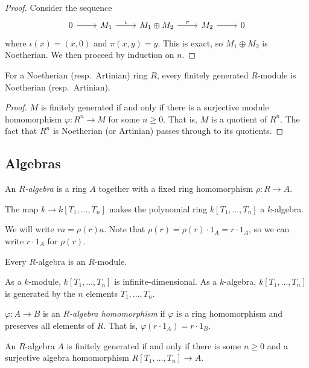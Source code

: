 \begin{proof}
    Consider the sequence
    \[\begin{tikzcd}
        0 & {M_1} & {M_1 \oplus M_2} & {M_2} & 0
        \arrow[from=1-1, to=1-2]
        \arrow["\iota", from=1-2, to=1-3]
        \arrow["\pi", from=1-3, to=1-4]
        \arrow[from=1-4, to=1-5]
    \end{tikzcd}\]
    where \( \iota(x) = (x, 0) \) and \( \pi(x, y) = y \).
    This is exact, so \( M_1 \oplus M_2 \) is Noetherian.
    We then proceed by induction on \( n \).
\end{proof}
\begin{proposition}
    For a Noetherian (resp.\ Artinian) ring \( R \), every finitely generated \( R \)-module is Noetherian (resp.\ Artinian).
\end{proposition}
\begin{proof}
    \( M \) is finitely generated if and only if there is a surjective module homomorphism \( \varphi : R^n \to M \) for some \( n \geq 0 \).
    That is, \( M \) is a quotient of \( R^n \).
    The fact that \( R^n \) is Noetherian (or Artinian) passes through to its quotients.
\end{proof}

\subsection{Algebras}
\begin{definition}
    An \emph{\( R \)-algebra} is a ring \( A \) together with a fixed ring homomorphism \( \rho : R \to A \).
\end{definition}
\begin{example}
    The map \( k \to k[T_1, \dots, T_n] \) makes the polynomial ring \( k[T_1, \dots, T_n] \) a \( k \)-algebra.
\end{example}
We will write \( ra = \rho(r) a \).
Note that \( \rho(r) = \rho(r) \cdot 1_A = r \cdot 1_A \), so we can write \( r \cdot 1_A \) for \( \rho(r) \).
\begin{remark}
    Every \( R \)-algebra is an \( R \)-module.
\end{remark}
\begin{example}
    As a \( k \)-module, \( k[T_1, \dots, T_n] \) is infinite-dimensional.
    As a \( k \)-algebra, \( k[T_1, \dots, T_n] \) is generated by the \( n \) elements \( T_1, \dots, T_n \).
\end{example}
\begin{definition}
    \( \varphi : A \to B \) is an \emph{\( R \)-algebra homomorphism} if \( \varphi \) is a ring homomorphism and preserves all elements of \( R \).
    That is, \( \varphi(r \cdot 1_A) = r \cdot 1_B \).
\end{definition}
An \( R \)-algebra \( A \) is finitely generated if and only if there is some \( n \geq 0 \) and a surjective algebra homomorphism \( R[T_1, \dots, T_n] \to A \).
